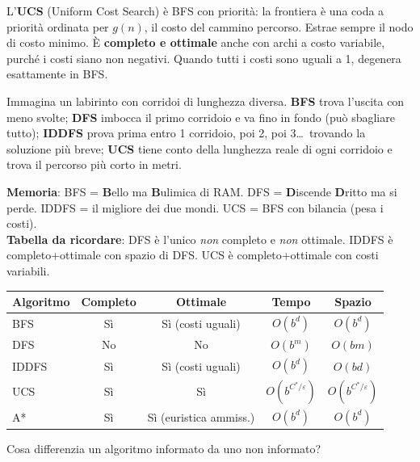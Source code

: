 \documentclass[12pt,a4paper]{article}
\begin{document}
L'\textbf{UCS} (Uniform Cost Search) è BFS con priorità: la frontiera è una coda a priorità ordinata per $g(n)$, il costo del cammino percorso. Estrae sempre il nodo di costo minimo. È \textbf{completo e ottimale} anche con archi a costo variabile, purché i costi siano non negativi. Quando tutti i costi sono uguali a 1, degenera esattamente in BFS.

\begin{esempiobox}
Immagina un labirinto con corridoi di lunghezza diversa. \textbf{BFS} trova l'uscita con meno svolte; \textbf{DFS} imbocca il primo corridoio e va fino in fondo (può sbagliare tutto); \textbf{IDDFS} prova prima entro 1 corridoio, poi 2, poi 3\ldots\ trovando la soluzione più breve; \textbf{UCS} tiene conto della lunghezza reale di ogni corridoio e trova il percorso più corto in metri.
\end{esempiobox}

\begin{ricordabox}
\textbf{Memoria}: BFS = \textbf{B}ello ma \textbf{B}ulimica di RAM. DFS = \textbf{D}iscende \textbf{D}ritto ma si perde. IDDFS = il migliore dei due mondi. UCS = BFS con bilancia (pesa i costi).\\[3pt]
\textbf{Tabella da ricordare}: DFS è l'unico \emph{non} completo e \emph{non} ottimale. IDDFS è completo+ottimale con spazio di DFS. UCS è completo+ottimale con costi variabili.
\end{ricordabox}

\begin{center}
\renewcommand{\arraystretch}{1.3}
\begin{tabular}{lcccc}
\toprule
\textbf{Algoritmo} & \textbf{Completo} & \textbf{Ottimale} & \textbf{Tempo} & \textbf{Spazio} \\
\midrule
BFS       & Sì & Sì (costi uguali) & $O(b^d)$   & $O(b^d)$ \\
DFS       & No & No                & $O(b^m)$   & $O(bm)$ \\
IDDFS     & Sì & Sì (costi uguali) & $O(b^d)$   & $O(bd)$ \\
UCS       & Sì & Sì                & $O(b^{C^*/\varepsilon})$ & $O(b^{C^*/\varepsilon})$ \\
A*        & Sì & Sì (euristica ammiss.) & $O(b^d)$ & $O(b^d)$ \\
\bottomrule
\end{tabular}
\end{center}

\begin{domandabox}{Cosa differenzia un algoritmo informato da uno non informato?}
\end{domandabox}
\end{document}
